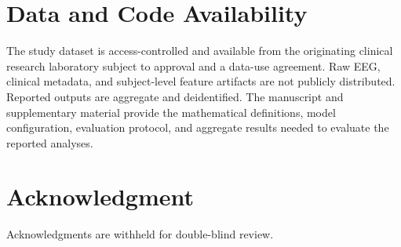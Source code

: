 \documentclass[journal]{IEEEtran}
\begin{document}
\section*{Data and Code Availability}
The study dataset is access-controlled and available from the originating clinical research laboratory subject to approval and a data-use agreement. Raw EEG, clinical metadata, and subject-level feature artifacts are not publicly distributed. Reported outputs are aggregate and deidentified. The manuscript and supplementary material provide the mathematical definitions, model configuration, evaluation protocol, and aggregate results needed to evaluate the reported analyses.

\section*{Acknowledgment}
Acknowledgments are withheld for double-blind review.
\end{document}
